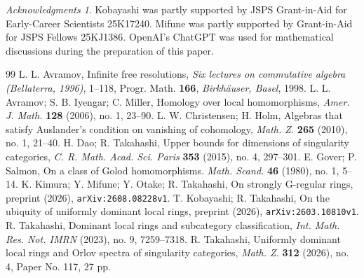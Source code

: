 \documentclass[10pt]{amsart}
\theoremstyle{definition}
\theoremstyle{remark}
\newtheorem*{ac}{Acknowledgments}
\numberwithin{equation}{thm}
\begin{document}
\begin{ac}
Kobayashi was partly supported by JSPS Grant-in-Aid for Early-Career Scientists 25K17240.
Mifune was partly supported by Grant-in-Aid for JSPS Fellows 25KJ1386.
OpenAI's ChatGPT was used for mathematical discussions during the preparation of this paper.
\end{ac}
\begin{thebibliography}{99}
{\sc L. L. Avramov}, Infinite free resolutions, {\em Six lectures on commutative algebra (Bellaterra, 1996)}, 1--118, Progr. Math. {\bf 166}, {\em Birkh\"auser, Basel}, 1998.
{\sc L. L. Avramov; S. B. Iyengar; C. Miller}, Homology over local homomorphisms, {\em Amer. J. Math.} {\bf 128} (2006), no. 1, 23--90.
{\sc L. W. Christensen; H. Holm}, Algebras that satisfy Auslander's condition on vanishing of cohomology, {\em Math. Z.} {\bf 265} (2010), no. 1, 21--40.
{\sc H. Dao; R. Takahashi}, Upper bounds for dimensions of singularity categories, {\em C. R. Math. Acad. Sci. Paris} {\bf 353} (2015), no. 4, 297--301.
{\sc E. Gover; P. Salmon}, On a class of Golod homomorphisms. {\em Math. Scand.} {\bf 46} (1980), no. 1, 5--14.
{\sc K. Kimura; Y. Mifune; Y. Otake; R. Takahashi}, On strongly G-regular rings, preprint (2026), {\tt arXiv:2608.08228v1}.
{\sc T. Kobayashi; R. Takahashi}, On the ubiquity of uniformly dominant local rings, preprint (2026), {\tt arXiv:2603.10810v1}.
{\sc R. Takahashi}, Dominant local rings and subcategory classification, {\em Int. Math. Res. Not. IMRN} (2023), no. 9, 7259--7318.
{\sc R. Takahashi}, Uniformly dominant local rings and Orlov spectra of singularity categories, {\em Math. Z.} {\bf 312} (2026), no. 4, Paper No. 117, 27 pp.
\end{thebibliography}
\end{document}
